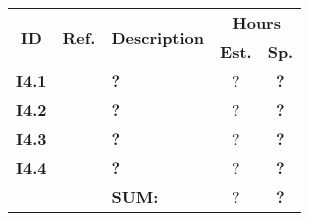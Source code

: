   \label{tab:sprint4stories}
 \def\arraystretch{1.25}
 
\begin{longtable}{ccXcc}

\toprule[0.5mm]
\multirow{2}{*}{\textbf{ID}} &
\multirow{2}{*}{\textbf{Ref.}} & \multirow{2}{*}{\textbf{Description}} & \multicolumn{2}{c}{\textbf{Hours}} \\
 					& & & \textbf{Est.} & \textbf{Sp.} \\
\midrule
\textbf{I4.1} 	& 	& {\bf ?}	& ?	& \textbf{?} \\

\textbf{I4.2} 	& 	& {\bf ?}	& ?	& \textbf{?} \\

\textbf{I4.3} 	& 	& {\bf ?} 	& ? & \textbf{?} \\	

\textbf{I4.4} 	& 	& {\bf ?} 	& ? & \textbf{?} \\
	
\midrule
		
				&& \textbf{SUM:}		&		?	& \textbf{?}
 \\																			
\bottomrule[0.5mm]
\end{longtable}
